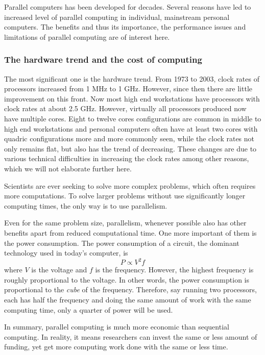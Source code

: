 Parallel computers has been developed for decades. Several reasons have led to
increased level of parallel computing in individual, mainstream personal
computers. The benefits and thus its importance, the performance issues and
limitations of parallel computing are of interest here.

\subsubsection{The hardware trend and the cost of computing}
\label{ssub:The hardware trend and the cost of computing}

The most significant one is the hardware trend. From 1973 to 2003, clock rates
of processors increased from 1 MHz to 1 GHz. However, since then there are
little improvement on this front. Now most high end workstations have
processors with clock rates at about 2.5 GHz. However, virtually all
processors produced now have multiple cores. Eight to twelve cores
configurations are common in middle to high end workstations and personal
computers often have at least two cores with quadric configurations more and
more commonly seen, while the clock rates not only remains flat, but also has
the trend of decreasing. These changes are due to various technical
difficulties in increasing the clock rates among other reasons, which we will
not elaborate further here.

Scientists are ever seeking to solve more complex problems, which often
requires more computations. To solve larger problems without use significantly
longer computing times, the only way is to use parallelism.

Even for the same problem size, parallelism, whenever possible also has other
benefits apart from reduced computational time. One more important of them is
the power consumption. The power consumption of a \cmos circuit, the dominant
technology used in today's computer, is
\begin{equation}
  P \propto V^2f
\end{equation}
where $V$ is the voltage and $f$ is the frequency. However, the highest
frequency is roughly proportional to the voltage. In other words, the power
consumption is proportional to the \emph{cube} of the frequency. Therefore,
say running two processors, each has half the frequency and doing the same
amount of work with the same computing time, only a quarter of power will be
used.

In summary, parallel computing is much more economic than sequential
computing. In reality, it means researchers can invest the same or less amount
of funding, yet get more computing work done with the same or less time.

